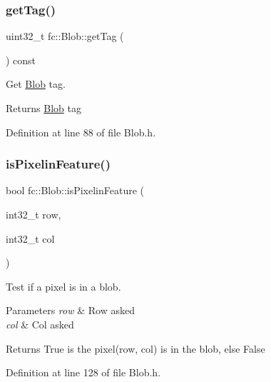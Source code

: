 \subsubsection{\texorpdfstring{get\+Tag()}{getTag()}}
{\footnotesize\ttfamily uint32\+\_\+t fc\+::\+Blob\+::get\+Tag (\begin{DoxyParamCaption}{ }\end{DoxyParamCaption}) const\hspace{0.3cm}{\ttfamily [inline]}}



Get \hyperlink{classfc_1_1Blob}{Blob} tag. 

\begin{DoxyReturn}{Returns}
\hyperlink{classfc_1_1Blob}{Blob} tag 
\end{DoxyReturn}


Definition at line 88 of file Blob.\+h.

\mbox{\label{classfc_1_1Blob_a462ba30be4256cccc0270ab0d278bb07}} 
\subsubsection{\texorpdfstring{is\+Pixelin\+Feature()}{isPixelinFeature()}}
{\footnotesize\ttfamily bool fc\+::\+Blob\+::is\+Pixelin\+Feature (\begin{DoxyParamCaption}\item[{int32\+\_\+t}]{row,  }\item[{int32\+\_\+t}]{col }\end{DoxyParamCaption})\hspace{0.3cm}{\ttfamily [inline]}}



Test if a pixel is in a blob. 


\begin{DoxyParams}{Parameters}
{\em row} & Row asked \\
\hline
{\em col} & Col asked \\
\hline
\end{DoxyParams}
\begin{DoxyReturn}{Returns}
True is the pixel(row, col) is in the blob, else False 
\end{DoxyReturn}


Definition at line 128 of file Blob.\+h.

